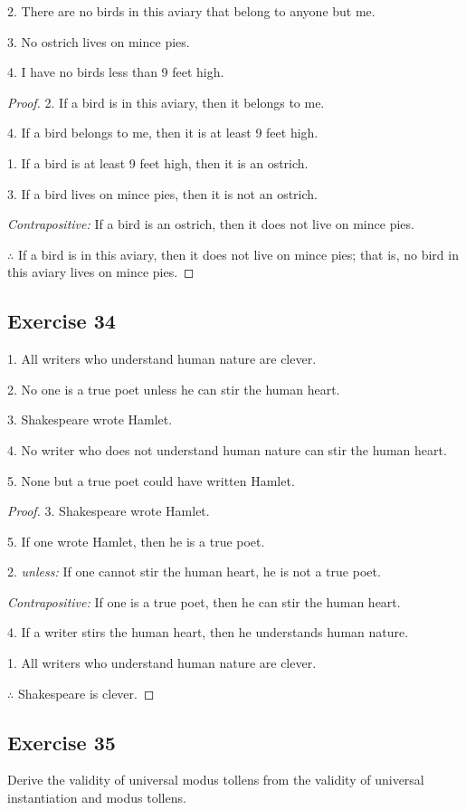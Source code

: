 \documentclass[14pt]{extarticle}
\begin{document}
2. There are no birds in this aviary that belong to anyone but me.

3. No ostrich lives on mince pies.

4. I have no birds less than 9 feet high.

\begin{proof}
2. If a bird is in this aviary, then it belongs to me.

4. If a bird belongs to me, then it is at least 9 feet high.

1. If a bird is at least 9 feet high, then it is an ostrich.

3. If a bird lives on mince pies, then it is not an ostrich.

{\it Contrapositive:} If a bird is an ostrich, then it does not live on mince pies.

$\therefore$ If a bird is in this aviary, then it does not live on mince pies; that is, no bird in this aviary lives on mince pies.
\end{proof}

\subsection{Exercise 34}
1. All writers who understand human nature are clever.

2. No one is a true poet unless he can stir the human heart.

3. Shakespeare wrote Hamlet.

4. No writer who does not understand human nature can stir the human heart.

5. None but a true poet could have written Hamlet.

\begin{proof}
3. Shakespeare wrote Hamlet.

5. If one wrote Hamlet, then he is a true poet.

2. {\it unless:} If one cannot stir the human heart, he is not a true poet.

{\it Contrapositive:} If one is a true poet, then he can stir the human heart.

4. If a writer stirs the human heart, then he understands human nature.

1. All writers who understand human nature are clever.

$\therefore$ Shakespeare is clever.
\end{proof}

\subsection{Exercise 35}
Derive the validity of universal modus tollens from the validity of universal instantiation and modus tollens.
\end{document}
